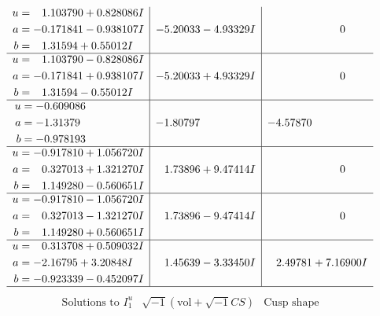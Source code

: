 \documentclass[1p]{elsarticle_modified}
\theoremstyle{definition}
\newcommand{\I}{\sqrt{-1}}
\begin{document}
$$\begin{array}{c|c|c}
\begin{aligned}
u &= \phantom{-}1.103790 + 0.828086 I \\
a &= -0.171841 - 0.938107 I \\
b &= \phantom{-}1.31594 + 0.55012 I\end{aligned}
 & -5.20033 - 4.93329 I & \phantom{-0.000000 } 0 \\ \hline\begin{aligned}
u &= \phantom{-}1.103790 - 0.828086 I \\
a &= -0.171841 + 0.938107 I \\
b &= \phantom{-}1.31594 - 0.55012 I\end{aligned}
 & -5.20033 + 4.93329 I & \phantom{-0.000000 } 0 \\ \hline\begin{aligned}
u &= -0.609086\phantom{ +0.000000I} \\
a &= -1.31379\phantom{ +0.000000I} \\
b &= -0.978193\phantom{ +0.000000I}\end{aligned}
 & -1.80797\phantom{ +0.000000I} & -4.57870\phantom{ +0.000000I} \\ \hline\begin{aligned}
u &= -0.917810 + 1.056720 I \\
a &= \phantom{-}0.327013 + 1.321270 I \\
b &= \phantom{-}1.149280 - 0.560651 I\end{aligned}
 & \phantom{-}1.73896 + 9.47414 I & \phantom{-0.000000 } 0 \\ \hline\begin{aligned}
u &= -0.917810 - 1.056720 I \\
a &= \phantom{-}0.327013 - 1.321270 I \\
b &= \phantom{-}1.149280 + 0.560651 I\end{aligned}
 & \phantom{-}1.73896 - 9.47414 I & \phantom{-0.000000 } 0 \\ \hline\begin{aligned}
u &= \phantom{-}0.313708 + 0.509032 I \\
a &= -2.16795 + 3.20848 I \\
b &= -0.923339 - 0.452097 I\end{aligned}
 & \phantom{-}1.45639 - 3.33450 I & \phantom{-}2.49781 + 7.16900 I\\
 \hline 
 \end{array}$$\newpage$$\begin{array}{c|c|c}  
\text{Solutions to }I^u_{1}& \I (\text{vol} + \sqrt{-1}CS) & \text{Cusp shape}\\

\end{array}$$
\end{document}
